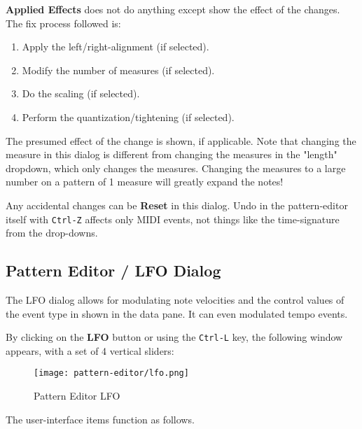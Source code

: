    \textbf{Applied Effects} does not do anything except show the effect of the
   changes. The fix process followed is:

   \begin{enumerate}
      \item Apply the left/right-alignment (if selected).
      \item Modify the number of measures (if selected).
      \item Do the scaling (if selected).
      \item Perform the quantization/tightening (if selected).
   \end{enumerate}

   The presumed effect of the change is shown, if applicable.
   Note that changing the measure in this dialog is different from
   changing the measures in the "length" dropdown, which only changes the
   measures.
   Changing the measures to a large number on a pattern of 1 measure will
   greatly expand the notes!

   Any accidental changes can be \textbf{Reset}
   in this dialog.
   Undo in the pattern-editor itself with \texttt{Ctrl-Z} affects
   only MIDI events, not things like the time-signature from the
   drop-downs.

\subsection{Pattern Editor / LFO Dialog}
\label{subsec:pattern_editor_lfo_panel}

   The LFO dialog allows for modulating note velocities and the control values
   of the event type in shown in the data pane.
   It can even modulated tempo events.

   By clicking on the \textbf{LFO} button or using the \texttt{Ctrl-L} key,
   the following window appears, with a set of 4 vertical sliders:

\begin{figure}[H]
   \centering 
  \texttt{[image: pattern-editor/lfo.png]}
   \caption{Pattern Editor LFO}
   \label{fig:pattern_editor_bottom_lfo}
\end{figure}
   
   The user-interface items function as follows.

